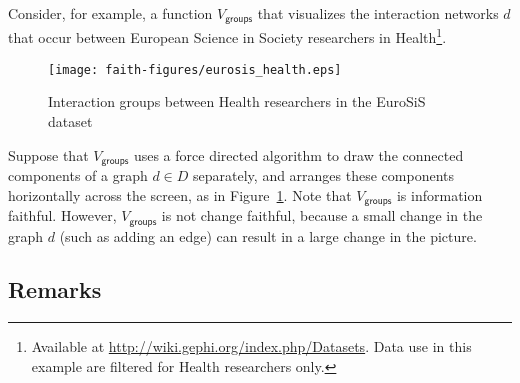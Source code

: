 \documentclass[10pt,journal,cspaper,compsoc]{IEEEtran}
\newcommand{\groups}{\textsf{groups}}
\begin{document}
Consider, for example, a function $V_{\groups}$ that visualizes the interaction networks $d$ that occur between European Science in Society researchers in Health\footnote{Available at \url{http://wiki.gephi.org/index.php/Datasets}. Data use in this example are filtered for Health researchers only.}.

\begin{figure}\centering
\texttt{[image: faith-figures/eurosis\_health.eps]}
\caption{Interaction groups between Health researchers in the EuroSiS dataset}\label{fig:eurosis}
\end{figure}

Suppose that $V_{\groups}$ uses a force directed algorithm to draw the connected components of a graph $d \in D$ separately, and arranges these components horizontally across the screen, as in Figure~\ref{fig:eurosis}. Note that $V_{\groups}$ is information faithful. However, $V_{\groups}$ is not change faithful, because a small change in the graph $d$ (such as adding an edge) can result in a large change in the picture.

\subsection{Remarks}
\end{document}

